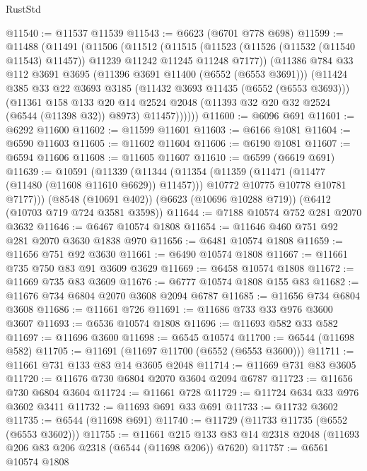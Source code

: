 \begin{lexlean}{RustStd}
\begin{coremodule}
@11540 := @11537 @11539
@11543 := @6623 (@6701 @778 @698)
@11599 := @11488
    (@11491
      (@11506
        (@11512
          (@11515
            (@11523 (@11526 (@11532 (@11540 @11543) @11457)) @11239 @11242 @11245 @11248 @7177))
          (@11386
            @784
            @33
            @112
            @3691
            @3695
            (@11396 @3691 @11400 (@6552 (@6553 @3691)))
            (@11424
              @385
              @33
              @22
              @3693
              @3185
              (@11432 @3693 @11435 (@6552 (@6553 @3693)))
              (@11361
                @158
                @133
                @20
                @14
                @2524
                @2048
                (@11393 @32 @20 @32 @2524 (@6544 (@11398 @32)) @8973)
                @11457))))))
@11600 := @6096 @691
@11601 := @6292 @11600
@11602 := @11599 @11601
@11603 := @6166 @1081
@11604 := @6590 @11603
@11605 := @11602 @11604
@11606 := @6190 @1081
@11607 := @6594 @11606
@11608 := @11605 @11607
@11610 := @6599 (@6619 @691)
@11639 := @10591
    (@11339
      (@11344
        (@11354
          (@11359 (@11471 (@11477 (@11480 (@11608 @11610 @6629)) @11457)))
          @10772
          @10775
          @10778
          @10781
          @7177)))
    (@8548 (@10691 @402))
    (@6623 (@10696 @10288 @719))
    (@6412 (@10703 @719 @724 @3581 @3598))
@11644 := @7188 @10574 @752 @281 @2070 @3632
@11646 := @6467 @10574 @1808
@11654 := @11646 @460 @751 @92 @281 @2070 @3630 @1838 @970
@11656 := @6481 @10574 @1808
@11659 := @11656 @751 @92 @3630
@11661 := @6490 @10574 @1808
@11667 := @11661 @735 @750 @83 @91 @3609 @3629
@11669 := @6458 @10574 @1808
@11672 := @11669 @735 @83 @3609
@11676 := @6777 @10574 @1808 @155 @83
@11682 := @11676 @734 @6804 @2070 @3608 @2094 @6787
@11685 := @11656 @734 @6804 @3608
@11686 := @11661 @726
@11691 := @11686 @733 @33 @976 @3600 @3607
@11693 := @6536 @10574 @1808
@11696 := @11693 @582 @33 @582
@11697 := @11696 @3600
@11698 := @6545 @10574
@11700 := @6544 (@11698 @582)
@11705 := @11691 (@11697 @11700 (@6552 (@6553 @3600)))
@11711 := @11661 @731 @133 @83 @14 @3605 @2048
@11714 := @11669 @731 @83 @3605
@11720 := @11676 @730 @6804 @2070 @3604 @2094 @6787
@11723 := @11656 @730 @6804 @3604
@11724 := @11661 @728
@11729 := @11724 @634 @33 @976 @3602 @3411
@11732 := @11693 @691 @33 @691
@11733 := @11732 @3602
@11735 := @6544 (@11698 @691)
@11740 := @11729 (@11733 @11735 (@6552 (@6553 @3602)))
@11755 := @11661
    @215
    @133
    @83
    @14
    @2318
    @2048
    (@11693 @206 @83 @206 @2318 (@6544 (@11698 @206)) @7620)
@11757 := @6561 @10574 @1808

\end{coremodule}
\end{lexlean}
